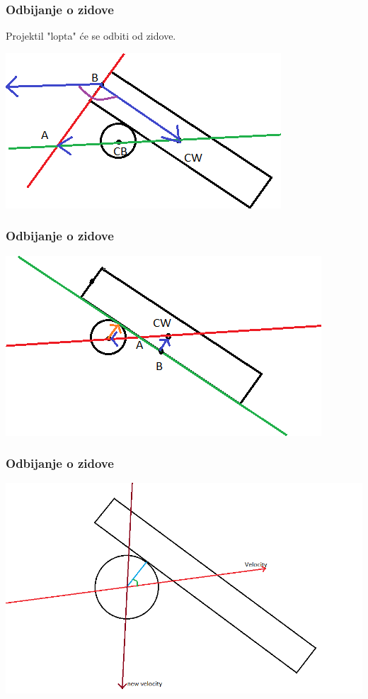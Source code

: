 \documentclass{beamer}
\begin{document}
\begin{frame}
	\frametitle{Odbijanje o zidove}
	Projektil "lopta" će se odbiti od zidove.
	
	\includegraphics[scale=0.75]{./images/odbijanje3.png}
\end{frame}

\begin{frame}
	\frametitle{Odbijanje o zidove}
	
	\includegraphics[scale=0.67]{./images/odbijanje2.png}
\end{frame}

\begin{frame}
	\frametitle{Odbijanje o zidove}
	
	\includegraphics[scale=0.34]{./images/odbijanje1.png}
\end{frame}
\end{document}
